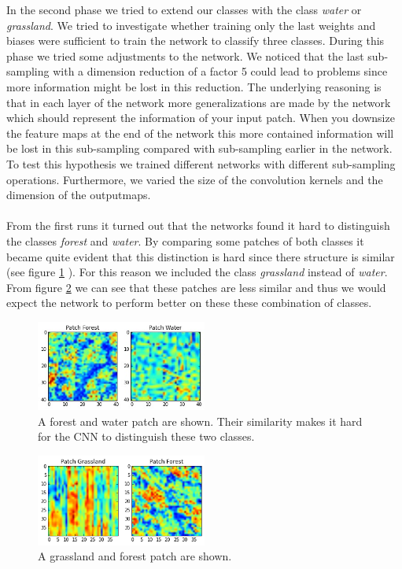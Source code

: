 \documentclass[a4paper,onecolumn]{report}
\begin{document}
In the second phase we tried to extend our classes with the class \textit{water} or \textit{grassland}. We tried to investigate whether training only the last weights and biases were sufficient to train the network to classify three classes. During this phase we tried some adjustments to the network. We noticed that the last sub-sampling with a dimension reduction of a factor 5 could lead to problems since more information might be lost in this reduction. The underlying reasoning is that in each layer of the network more generalizations are made by the network which should represent the information of your input patch. When you downsize the feature maps at the end of the network this more contained information will be lost in this sub-sampling compared with sub-sampling earlier in the network. To test this hypothesis we trained different networks with different sub-sampling operations. Furthermore, we varied the size of the convolution kernels and the dimension of the outputmaps. 
\\\\
From the first runs it turned out that the networks found it hard to distinguish the classes \textit{forest} and \textit{water}. By comparing some patches of both classes it became quite evident that this distinction is hard since there structure is similar (see figure \ref{fig:WaterForestPatch} ). For this reason we included the class \textit{grassland} instead of \textit{water}. From figure \ref{fig:GrassForestPatch} we can see that these patches are less similar and thus we would expect the network to perform better on these these combination of classes.


\begin{figure}[bth]
	\centering
	\includegraphics[width=0.5\textwidth]{./images/WaterForestPatch.jpg}
	\caption{A forest and water patch are shown. Their similarity makes it hard for the CNN to distinguish these two classes.}
	\label{fig:WaterForestPatch}
\end{figure}
\begin{figure}[bth]
	\centering
	\includegraphics[width=0.5\textwidth]{./images/GrassForestPatch.jpg}
	\caption{A grassland and forest patch are shown.}
	\label{fig:GrassForestPatch}
\end{figure}
\end{document}
